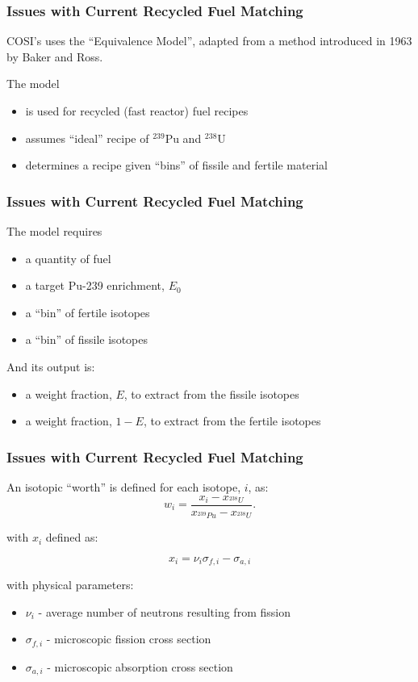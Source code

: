 \begin{frame}[ctb!]
  \frametitle{Issues with Current Recycled Fuel Matching}

  COSI's uses the ``Equivalence Model'', adapted from a method introduced in
  1963 by Baker and Ross\cite{baker_comparison_1963}.
  
  \vspace{0.2cm}

  The model
  \begin{itemize}
    \item is used for recycled (fast reactor) fuel recipes
    \item assumes ``ideal'' recipe of $^{239}$Pu and $^{238}$U
    \item determines a recipe given ``bins'' of fissile and fertile material
  \end{itemize}
\end{frame}

\begin{frame}[ctb!]
  \frametitle{Issues with Current Recycled Fuel Matching}

  The model requires
  \begin{itemize}
    \item a quantity of fuel
    \item a target Pu-239 enrichment, $E_0$
    \item a ``bin'' of fertile isotopes
    \item a ``bin'' of fissile isotopes
  \end{itemize}

  And its output is:
  \begin{itemize}
    \item a weight fraction, $E$, to extract from the fissile isotopes
    \item a weight fraction, $1-E$, to extract from the fertile isotopes
  \end{itemize}
\end{frame}

\begin{frame}[ctb!]
  \frametitle{Issues with Current Recycled Fuel Matching}
  
  An isotopic ``worth'' is defined for each isotope, $i$, as:
  \begin{equation}
    w_i = \frac{x_i - x_{^{238}U}}
    {x_{^{239}Pu} - x_{^{238}U}}.
  \end{equation}

  with $x_i$ defined as:
  
  \begin{equation}
    x_i = \nu_{i} \sigma_{f,i} - \sigma_{a,i}
  \end{equation}

  with physical parameters:
  \begin{itemize}
    \item $\nu_{i}$ - average number of neutrons resulting from fission
    \item $\sigma_{f,i}$ - microscopic fission cross section
    \item $\sigma_{a,i}$ - microscopic absorption cross section
  \end{itemize}
\end{frame}

